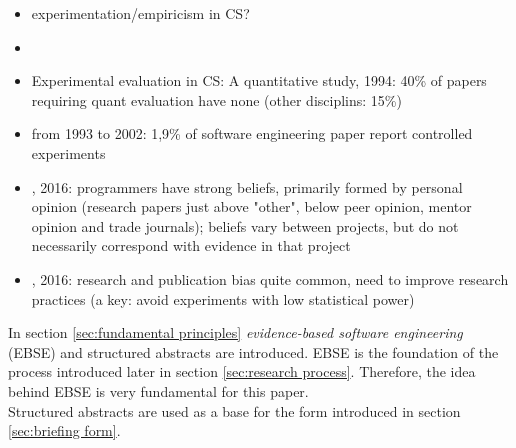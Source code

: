 \begin{itemize}
\item experimentation/empiricism in CS?
\item {}
\item Experimental evaluation in CS: A quantitative study, 1994: 40\% of papers requiring quant evaluation have none (other disciplins: 15\%)
\item {} from 1993 to 2002: 1,9\% of software engineering paper report controlled experiments
\item {}, 2016: programmers have strong beliefs, primarily formed by personal opinion (research papers just above "other", below peer opinion, mentor opinion and trade journals); beliefs vary between projects, but do not necessarily correspond with evidence in that project
\item {}, 2016: research and publication bias quite common, need to improve research practices (a key: avoid experiments with low statistical power)
\end{itemize}


In section \ref{sec:fundamental principles} \emph{evidence-based software engineering} (EBSE) and structured abstracts are introduced. EBSE is the foundation of the process introduced later in section \ref{sec:research process}. Therefore, the idea behind EBSE is very fundamental  for this paper.\\
Structured abstracts are used as a base for the form introduced in section \ref{sec:briefing form}.\\














